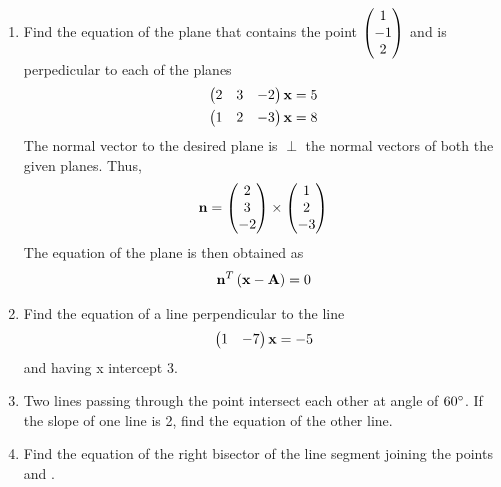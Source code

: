 \documentclass[journal,12pt,twocolumn]{IEEEtran}
\renewcommand\thesection{\arabic{section}}
\begin{document}
\begin{enumerate}[label=\thesection.\arabic*.,ref=\thesection.\theenumi]
\item Find the equation of the plane that contains the point $\begin{pmatrix}1\\-1\\2\end{pmatrix}$ and is perpedicular to each of the planes
\begin{align}
\begin{pmatrix}2 & 3 & -2\end{pmatrix}\mathbf{x}&=5
\\
\begin{pmatrix}1 & 2 & -3\end{pmatrix}\mathbf{x}&=8
\end{align}
%
\solution The normal vector to the desired plane is $\perp$ the normal vectors of both the given planes.  Thus,
%
\begin{align}
\mathbf{n} = \begin{pmatrix}2 \\ 3 \\ -2\end{pmatrix} \times \begin{pmatrix}1 \\ 2 \\ -3\end{pmatrix}
\end{align}
%
The equation of the plane is then obtained as
%
\begin{align}
\mathbf{n}^T\left(\mathbf{x}-\mathbf{A}\right) = 0
\end{align}
%
\item Find the equation of a line perpendicular to the line 
\begin{align}
\begin{pmatrix}1 & -7\end{pmatrix}\mathbf{x} = -5
\end{align}
and having x intercept 3.
\\
\solution
%

\item Two lines passing through the point  intersect each other at angle of $60\degree$.  If the slope of one line is 2, find the equation of the other line.
\\
\solution
%
\item Find the equation of the right bisector of the line segment joining the points  and .
\\
\solution
%


\end{enumerate}
\end{document}

